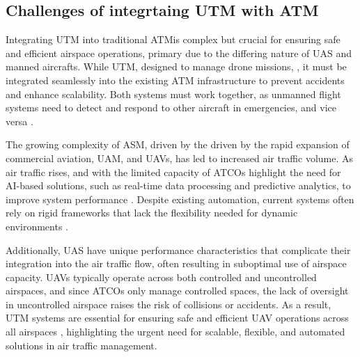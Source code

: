 \subsection{Challenges of integrtaing UTM with ATM}

Integrating \gls{UTM} into traditional \gls{ATM}is complex but crucial for ensuring safe and efficient airspace operations, primary due to the differing nature of \gls{UAS} and manned aircrafts. 
While \gls{UTM}, designed to manage drone missions, , it must be integrated seamlessly into the existing \gls{ATM} infrastructure to prevent accidents and enhance scalability. 
Both systems must work together, as unmanned flight systems need to detect and respond to other aircraft in emergencies, and vice versa \cite{flynex2020utm_atm}.

The growing complexity of \gls{ASM}, driven by the driven by the rapid expansion of commercial aviation, \gls{UAM}, and \glspl{UAV}, has led to increased air traffic volume.
As air traffic rises, and with the limited capacity of \glspl{ATCO} highlight the need for AI-based solutions, such as real-time data processing and predictive analytics, to improve system performance \cite{Ramachandran_2025}.
Despite existing automation, current systems often rely on rigid frameworks that lack the flexibility needed for dynamic environments  \cite{Meier_2024}.

Additionally, \gls{UAS} have unique performance characteristics that complicate their integration into the air traffic flow, often resulting in suboptimal use of airspace capacity.
\Glspl{UAV} typically operate across both controlled and uncontrolled airspaces, and since \glspl{ATCO} only manage controlled spaces, the lack of oversight in uncontrolled airspace raises the risk of collisions or accidents. 
As a result, \gls{UTM} systems are essential for ensuring safe and efficient \gls{UAV} operations across all airspaces \cite{Zsolt_2017}, highlighting the urgent need for scalable, flexible, and automated solutions in air traffic management.